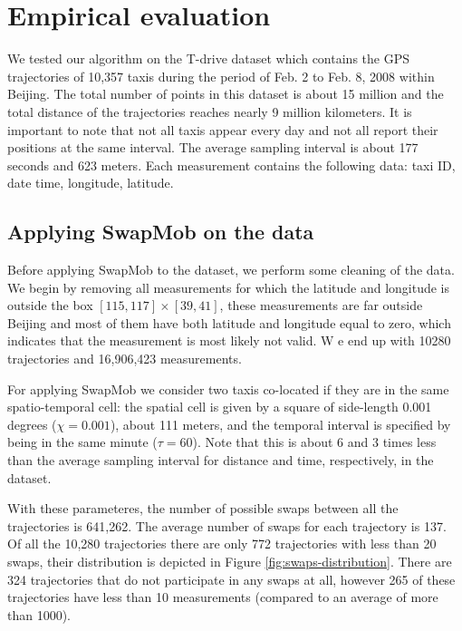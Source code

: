 \documentclass[times,twocolumn,final,authoryear]{elsarticle}
\begin{document}
\section{Empirical evaluation}\label{Sec:evaluation}
We tested our algorithm on the T-drive dataset
\citep{Yuan2010,Yuan2011} which contains the GPS trajectories of
10,357 taxis during the period of Feb. 2 to Feb. 8, 2008 within
Beijing. The total number of points in this dataset is about 15
million and the total distance of the trajectories reaches nearly 9
million kilometers. It is important to note that not all taxis appear
every day and not all report their positions at the same interval. The
average sampling interval is about 177 seconds and 623 meters. Each
measurement contains the following data: taxi ID, date time,
longitude, latitude.

\subsection{Applying SwapMob on the data}
Before applying SwapMob to the dataset, we perform some cleaning of the
data. We begin by removing all measurements for which the latitude and
longitude is outside the box $[115, 117] \times [39, 41]$, these
measurements are far outside Beijing and most of them have both
latitude and longitude equal to zero, which indicates that the
measurement is most likely not valid. W%
e end up with 10280 trajectories and 16,906,423
measurements.

For applying SwapMob we consider two taxis co-located if they are in
the same spatio-temporal cell: the spatial cell is given by a square of side-length 0.001 degrees ($\chi = 0.001$), about 111
meters, and the temporal interval is specified by being in the same minute ($\tau = 60$). 
Note that this is about 6 and 3 times less than the average sampling interval for distance and time, respectively, in the dataset.

With these parameteres, the number of possible swaps between all the
trajectories is 641,262. The average number of swaps for each
trajectory is 137. Of all the 10,280 trajectories there are only 772 trajectories with less than 20 swaps, their distribution is depicted in Figure
\ref{fig:swaps-distribution}. There are 324 trajectories that do not
participate in any swaps at all, however 265 of these trajectories
have less than 10 measurements (compared to an average of more than
1000). 
\end{document}
